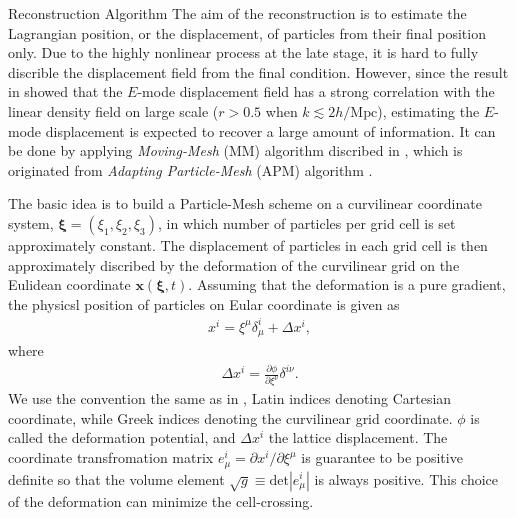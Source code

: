 \begin{section}{Reconstruction Algorithm}
  \label{sec:reconstruction}
The aim of the reconstruction is to estimate the Lagrangian position, or 
the displacement, of particles from their final position only. 
Due to the highly nonlinear process at the late stage, it is hard to 
fully discrible the displacement field from the final condition. 
However, since the result in \cite{bib:Yu2016} showed that the $E$-mode 
displacement field has a strong correlation with the linear density field 
on large scale ($r > 0.5$ when $k \lesssim 2 h/\mathrm{Mpc}$), estimating the 
$E$-mode displacement is expected to recover a large amount of information. 
It can be done by applying \textit{Moving-Mesh} (MM) algorithm discribed in 
\cite{bib:ZhuH2016}, which is originated from \textit{Adapting Particle-Mesh} 
(APM) algorithm \cite{bib:Pen1995,bib:Pen1998}.

The basic idea is to build a Particle-Mesh scheme on a curvilinear 
coordinate system, $\bm{\xi}=\left(\xi_1,\xi_2,\xi_3\right)$, in 
which number of particles per grid cell is set approximately constant. 
The displacement of particles in each grid cell is then approximately 
discribed by the deformation of the curvilinear grid on the Eulidean 
coordinate $\bm{x}(\bm{\xi},t)$.
Assuming that the deformation is a pure gradient, the physicsl position of 
particles on Eular coordinate is given as
\begin{align}
    x^i=\xi ^\mu \delta ^i _\mu + \Delta x^i,
\end{align}
where
\begin{align}
  \label{eq:disp}
    \Delta x^i=\frac{\partial \phi}{\partial \xi ^ \nu}\delta ^{i \nu} .
\end{align}
We use the convention the same as in \cite{bib:Pen1995}, Latin indices denoting 
Cartesian coordinate, while Greek indices denoting the curvilinear grid coordinate.
$\phi$ is called the deformation potential, and $\Delta x^i$ the lattice
displacement.
The coordinate transfromation matrix $e^i_\mu = \partial x^i / \partial \xi ^ \mu$
is guarantee to be positive definite so that the volume element 
$\sqrt{g} \equiv \mathrm{det}\left| e^i_\mu\right|$ is always positive. 
This choice of the deformation can minimize the cell-crossing.


\end{section}

